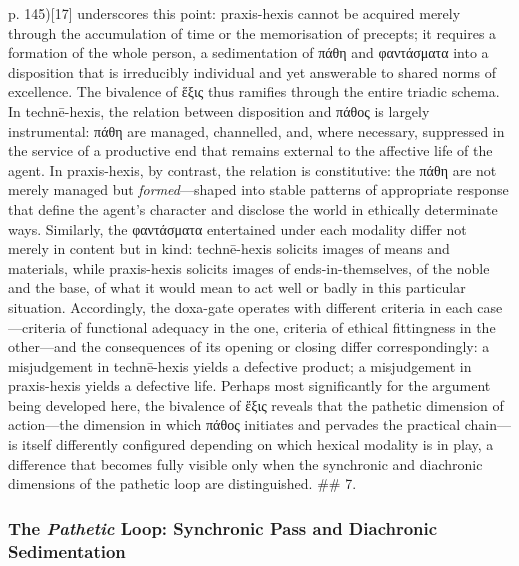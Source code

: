 \documentclass{article}
\begin{document}
p. 145)[17] underscores this point: praxis-hexis cannot be acquired merely through the accumulation of time or the memorisation of precepts; it requires a formation of the whole person, a sedimentation of πάθη and φαντάσματα into a disposition that is irreducibly individual and yet answerable to shared norms of excellence. The bivalence of ἕξις thus ramifies through the entire triadic schema. In technē-hexis, the relation between disposition and πάθος is largely instrumental: πάθη are managed, channelled, and, where necessary, suppressed in the service of a productive end that remains external to the affective life of the agent. In praxis-hexis, by contrast, the relation is constitutive: the πάθη are not merely managed but \textit{formed}—shaped into stable patterns of appropriate response that define the agent's character and disclose the world in ethically determinate ways. Similarly, the φαντάσματα entertained under each modality differ not merely in content but in kind: technē-hexis solicits images of means and materials, while praxis-hexis solicits images of ends-in-themselves, of the noble and the base, of what it would mean to act well or badly in this particular situation. Accordingly, the doxa-gate operates with different criteria in each case—criteria of functional adequacy in the one, criteria of ethical fittingness in the other—and the consequences of its opening or closing differ correspondingly: a misjudgement in technē-hexis yields a defective product; a misjudgement in praxis-hexis yields a defective life. Perhaps most significantly for the argument being developed here, the bivalence of ἕξις reveals that the pathetic dimension of action—the dimension in which πάθος initiates and pervades the practical chain—is itself differently configured depending on which hexical modality is in play, a difference that becomes fully visible only when the synchronic and diachronic dimensions of the pathetic loop are distinguished. ## 7. 

\subsubsection*{The \textit{Pathetic} Loop: Synchronic Pass and Diachronic Sedimentation}
\end{document}
